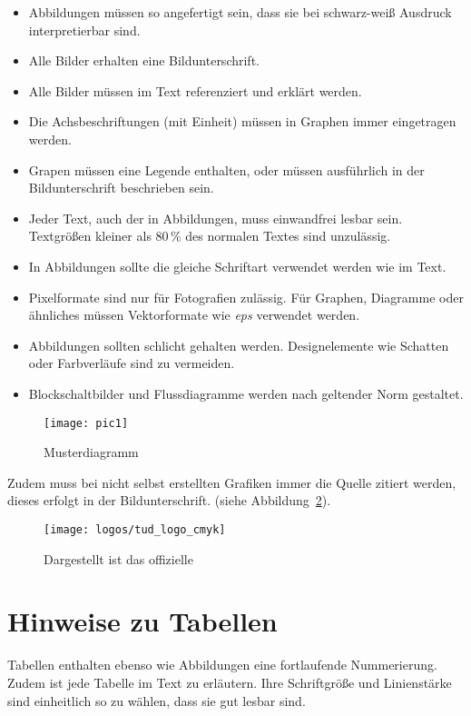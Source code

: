 \begin{itemize}
  \item Abbildungen müssen so angefertigt sein, dass sie bei schwarz-weiß Ausdruck interpretierbar sind.
  \item Alle Bilder erhalten eine Bildunterschrift.
  \item Alle Bilder müssen im Text referenziert und erklärt werden.
  \item Die Achsbeschriftungen (mit Einheit) müssen in Graphen immer eingetragen werden.
  \item Grapen müssen eine Legende enthalten, oder müssen ausführlich in der Bildunterschrift beschrieben sein.
  \item Jeder Text, auch der in Abbildungen, muss einwandfrei lesbar sein. Textgrößen kleiner als 80\,\% des normalen Textes sind unzulässig.
  \item In Abbildungen sollte die gleiche Schriftart verwendet werden wie im Text.
  \item Pixelformate sind nur für Fotografien zulässig. Für Graphen, Diagramme oder ähnliches müssen Vektorformate wie \textit{eps} verwendet werden.
  \item Abbildungen sollten schlicht gehalten werden. Designelemente wie Schatten oder Farbverläufe sind zu vermeiden.
  \item Blockschaltbilder und Flussdiagramme werden nach geltender Norm gestaltet.
\end{itemize}

\begin{figure}[htbp]
  \centering
  \texttt{[image: pic1]}
  \caption{Musterdiagramm}
  \label{fig:pic1}
\end{figure}

Zudem muss bei nicht selbst erstellten Grafiken immer die Quelle
zitiert werden, dieses erfolgt in der Bildunterschrift.
(siehe Abbildung~\ref{fig:tud_logo}).

\begin{figure}[htbp]
  \centering
  \texttt{[image: logos/tud\_logo\_cmyk]}
  \caption{Dargestellt ist das offizielle \cite{TuDo2}}
  \label{fig:tud_logo}
\end{figure}

\section{Hinweise zu Tabellen}
\label{hinweise:tabellen}

Tabellen enthalten ebenso wie Abbildungen eine fortlaufende
Nummerierung. Zudem ist jede Tabelle im Text zu erläutern. Ihre
Schriftgröße und Linienstärke sind einheitlich so zu wählen, 
dass sie gut lesbar sind.

